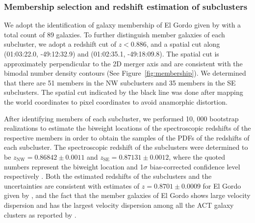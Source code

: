\subsubsection{Membership selection and redshift estimation of subclusters}
%
We adopt the identification of galaxy membership of El Gordo given by
 with a total count of 89 galaxies.
To further distinguish member galaxies of each subcluster, we adopt a
redshift cut of $z < 0.886$, and a spatial cut along (01:03:22.0,
-49:12:32.9) and (01:02:35.1, -49:18:09.8). The spatial cut is approximately perpendicular
to the 2D merger axis and are consistent with the bimodal number density
contours (See Figure~\ref{fig:membership}). We determined that
there are 51 members in the NW subclusters and 35 members in the SE
subclusters. 
The spatial cut indicated by the black line was done after
mapping the world coordinates to pixel coordinates to avoid anamorphic
distortion.  

After identifying members of each subcluster, we performed 10, 000 bootstrap realizations to estimate the biweight
locations of the spectroscopic redshifts of the respective members in order
to obtain the
samples of the PDFs of the redshifts of each subcluster. 
The spectroscopic redshift of the subclusters were
determined to be 
$z_{\mathrm{NW}} = 0.86842 \pm 0.0011$ and 
$z_{\mathrm{SE}} = 0.87131 \pm 0.0012$, where the quoted numbers represent the
biweight location and 1$\sigma$ bias-corrected confidence level
respectively \citep{Beers90}.  
Both the estimated redshifts of the subclusters and the uncertainties are
consistent with estimates of $z=0.8701 \pm 0.0009$ for El Gordo given by \citealt{Sifon13}, and the fact that the
member galaxies of El
Gordo shows large velocity dispersion and has the largest velocity
dispersion among all the ACT galaxy clusters as reported by
.

